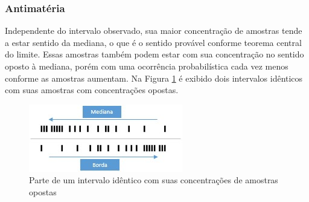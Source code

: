 \subsubsection{Antimatéria}
Independente do intervalo observado, sua maior concentração de amostras tende a estar sentido da mediana, o que é o sentido provável conforme teorema central do limite. Essas amostras também podem estar com sua concentração no sentido oposto à mediana, porém com uma ocorrência probabilística cada vez menos conforme as amostras aumentam. Na Figura \ref{fig:consciousness_concentration_of_opposite_samples} é exibido dois intervalos idênticos com suas amostras com concentrações opostas.
	\begin{figure}[H]
	\caption{Parte de um intervalo idêntico com suas concentrações de amostras opostas}
	\label{fig:consciousness_concentration_of_opposite_samples}
	\centering
	\includegraphics[scale=1.2]{sections/images/consciousness_concentration_of_opposite_samples.jpg}
	\end{figure}

